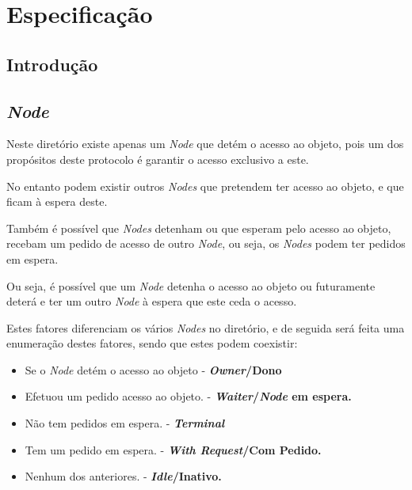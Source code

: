 \chapter{Especificação}
\label{chap:especificacao}

\section{Introdução}
\label{especificacao:sec:intro}
\section{\emph{Node}}

\begin{comment}
\end{comment}


Neste diretório existe apenas um \emph{Node} que detém o acesso ao objeto, pois um dos propósitos deste protocolo é garantir o acesso exclusivo a este. 


No entanto podem existir outros \emph{Nodes} que pretendem ter acesso ao objeto, e que ficam à espera deste. 

Também é possível que \emph{Nodes} detenham ou que esperam pelo acesso ao objeto, recebam um pedido de acesso de outro \emph{Node}, ou seja, os \emph{Nodes} podem ter pedidos em espera.

Ou seja, é possível que um \emph{Node} detenha o acesso ao objeto ou futuramente deterá e ter um outro \emph{Node} à espera que este ceda o acesso.

Estes fatores diferenciam os vários \emph{Nodes} no diretório,
e de seguida será feita uma enumeração destes fatores, sendo que estes podem coexistir:

\begin{itemize}
    \item Se o \emph{Node} detém o acesso ao objeto - \textbf{\emph{Owner}/Dono}
    \item Efetuou um pedido acesso ao objeto. - \textbf{\emph{Waiter}/\emph{Node} em espera. }

    \item Não tem pedidos em espera. - \textbf{\emph{Terminal}}
    \item Tem um pedido em espera. - \textbf{\emph{With Request}/Com Pedido.}

    \item Nenhum dos anteriores. - \textbf{\emph{Idle}/Inativo.}
\end{itemize}


